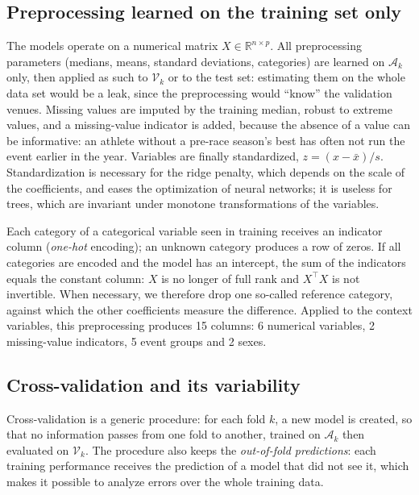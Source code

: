 \documentclass[11pt,a4paper]{article}
\begin{document}
\subsection{Preprocessing learned on the training set only}\label{sec:preprocessing}

The models operate on a numerical matrix $X \in \mathbb{R}^{n \times p}$. All preprocessing parameters (medians, means,
standard deviations, categories) are learned on $\mathcal{A}_k$ only, then applied as such to $\mathcal{V}_k$ or to the
test set: estimating them on the whole data set would be a leak, since the preprocessing would ``know'' the validation
venues. Missing values are imputed by the training median, robust to extreme values, and a missing-value indicator is
added, because the absence of a value can be informative: an athlete without a pre-race season's best has often not
run the event earlier in the year. Variables are finally standardized, $z = (x - \bar x)/s$. Standardization is
necessary for the ridge penalty, which depends on the scale of the coefficients, and eases the optimization of neural
networks; it is useless for trees, which are invariant under monotone transformations of the variables.

Each category of a categorical variable seen in training receives an indicator column (\emph{one-hot} encoding); an
unknown category produces a row of zeros. If all categories are encoded and the model has an intercept, the sum of the
indicators equals the constant column: $X$ is no longer of full rank and $X^\top X$ is not invertible. When necessary,
we therefore drop one so-called reference category, against which the other coefficients measure the difference.
Applied to the context variables, this preprocessing produces 15 columns: 6 numerical variables, 2 missing-value
indicators, 5 event groups and 2 sexes.

\subsection{Cross-validation and its variability}\label{sec:cv}

Cross-validation is a generic procedure: for each fold $k$, a new model is created, so that no information passes from
one fold to another, trained on $\mathcal{A}_k$ then evaluated on $\mathcal{V}_k$. The procedure also keeps the
\emph{out-of-fold predictions}: each training performance receives the prediction of a model that did not see it,
which makes it possible to analyze errors over the whole training data.
\end{document}
